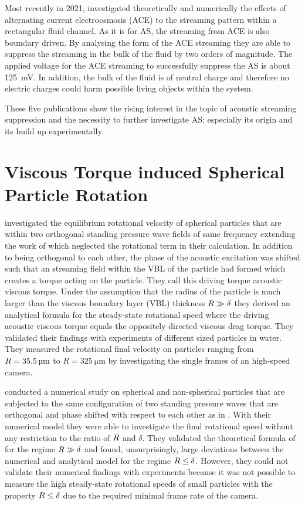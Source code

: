 Most recently in 2021,  investigated theoretically and 
numerically the effects of alternating current electroosmosis (ACE) to the 
streaming pattern within a rectangular fluid channel. As it is for AS, the 
streaming from ACE is also boundary driven. By analysing the form of the ACE 
streaming they are able to suppress the streaming in the bulk of the fluid by 
two orders of magnitude. The applied voltage for the ACE streaming to 
successfully suppress the AS is about \SI{125}{\milli\volt}. In addition, the 
bulk of the fluid is of neutral charge and therefore no electric charges could 
harm possible living objects within the system.

These five publications show the rising interest in the topic of acoustic 
streaming suppression and the necessity to further investigate AS; especially 
its origin and its build up experimentally.

\section{Viscous Torque induced Spherical Particle Rotation}

 investigated the equilibrium rotational velocity of 
spherical particles that are within two orthogonal standing pressure wave 
fields of same frequency extending the work of  which neglected 
the rotational term in their calculation. In addition to being orthogonal to 
each other, the phase of the acoustic excitation was shifted such that an 
streaming field within the VBL of the particle had formed which creates a 
torque acting on the particle. They call this driving torque acoustic viscous 
torque. Under the assumption that the radius of the particle is much larger 
than the viscous boundary layer (VBL) thickness $R\gg\delta$ they derived an 
analytical formula for the steady-state rotational speed where the driving 
acoustic viscous torque equals the oppositely directed viscous drag torque. 
They validated their findings with experiments of different sized particles in 
water. They measured the rotational final velocity on particles ranging from 
$R=\SI{35.5}{\si{\micro\meter}}$ to $R=\SI{325}{\um}$ by investigating the single frames of 
an high-speed camera.

 conducted a numerical study on spherical and non-spherical 
particles that are subjected to the same configuration of two standing pressure 
waves that are orthogonal and phase shifted with respect to each other as in 
. With their numerical model they were able to investigate 
the final rotational speed without any restriction to the ratio of $R$ and 
$\delta$. They validated the theoretical formula of~\cite{Lamprecht2015} for 
the regime $R\gg\delta$ and found, unsurprisingly, large deviations between 
the numerical and analytical model for the regime $R\leq\delta$. However, they 
could not validate their numerical findings with experiments because it was not 
possible to measure the high steady-state rotational speeds of small particles 
with the property $R\leq\delta$ due to the required minimal frame rate of the 
camera.

